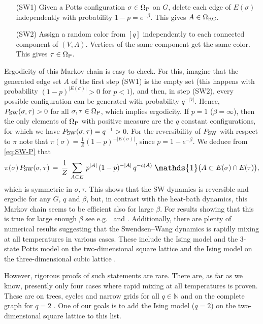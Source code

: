 \documentclass{dis}
\theoremstyle{citing}
\begin{document}
\begin{enumerate}
	\item[(SW1)] Given a Potts configuration $\sigma\in{{\Omega}_{\rm P}}$ on $G$, 
		delete each edge of $E(\sigma)$ independently with 
		probability $1-p = e^{-\beta}$. This gives $A\in{\Omega}_{\rm RC}$.
	\item[(SW2)] Assign a random color from $[q]$ independently to each 
		connected component of $(V,A)$. Vertices of the same component 
		get the same color. This gives $\tau\in{\Omega}_{\rm P}$.
\end{enumerate}
Ergodicity of this Markov chain is easy to check. 
For this, imagine 
that the generated edge set $A$ of the first step (SW1) is the empty 
set (this happens with probability $(1-p)^{{\left\vert {E(\sigma)} \right\vert}}>0$ 
for $p<1$), and 
then, in step (SW2), every possible configuration can be generated 
with probability $q^{-{\left\vert {V} \right\vert}}$. Hence, ${P_{\rm SW}}(\sigma,\tau)>0$ for all 
$\sigma,\tau\in{{\Omega}_{\rm P}}$, which implies ergodicity. 
If $p=1$ ($\beta=\infty$), then the only elements of ${{\Omega}_{\rm P}}$ 
with positive measure are the $q$ constant 
configurations, for which we have ${P_{\rm SW}}(\sigma,\tau)=q^{-1}>0$. 
For the reversibility of ${P_{\rm SW}}$ with respect to $\pi$ note that  
$\pi(\sigma)=\frac1Z (1-p)^{-{\left\vert {E(\sigma)} \right\vert}}$, since $p=1-e^{-\beta}$. 
We deduce from \eqref{eq:SW-P} that
\[
\pi(\sigma)\,{P_{\rm SW}}(\sigma,\tau)\,=\, \frac1Z\,\sum_{A\subset E} \,p^{{\left\vert {A} \right\vert}}\, 
	(1-p)^{-{\left\vert {A} \right\vert}}\, q^{-c(A)}\; 
	{\scalebox{1.2}{\raisebox{-0.2mm}{$\mathds{1}$}}}\bigl(A\subset E(\sigma)\cap E(\tau)\bigr),
\]
which is symmetric in $\sigma,\tau$.
This shows that the SW dynamics is reversible and ergodic for 
any $G$, $q$ and $\beta$, but, in contrast with the heat-bath 
dynamics, this Markov chain seems to be efficient also for 
large $\beta$. For results showing that this is true for large enough 
$\beta$ 
see e.g.~\cite{Hu} and \cite{M2}.
Additionally, there are plenty of numerical results suggesting 
that the Swendsen--Wang dynamics is rapidly mixing at all 
temperatures in various cases. 
These include the Ising model and the 3-state Potts model 
on the two-dimensional square 
lattice \cite{DuZhengWang,SalasSokal} and the Ising 
model on the three-dimensional cubic lattice \cite{OssolaSokal}.

However, rigorous proofs of such statements are rare. 
There are, as far as we know, presently only four cases where 
rapid mixing at all temperatures is proven. 
These are on trees, cycles \cite{CF, Hu, Long} and 
narrow grids \cite{CDFR} for all $q\in{\ensuremath{\mathbb{N}}}$ and 
on the complete graph for $q=2$ \cite{Long,LNP}. 
One of our goals is to add the Ising model ($q=2$) on 
the two-dimensional square lattice to this list.
\end{document}
